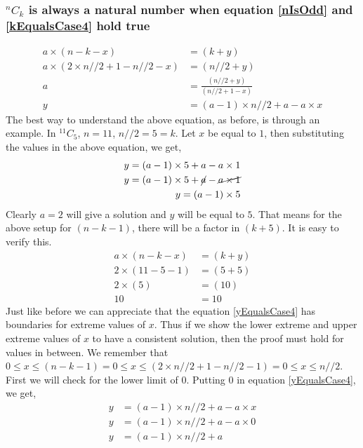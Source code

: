 \documentclass[12pt, twoside]{article}
\newcommand*{\Combination}[2]{{}^{#1}C_{#2}}%
\begin{document}
\subsubsection{$\Combination{n}{k}$ is always a natural number when equation \eqref{nIsOdd} and \eqref{kEqualsCase4} hold true}\label{ProofkEqualsCase4}
\begin{align}
	a \times (n-k-x) &= (k+y) \nonumber \\
	a \times (2\times n//2 + 1 - n//2 - x) &= (n//2 + y) \nonumber \\
	a &= \frac{(n//2 + y)}{(n//2 + 1 - x)} \nonumber \\
	y &= (a-1)\times n//2 + a - a\times x \label{yEqualsCase4}	
\end{align}
The best way to understand the above equation, as before, is through an example.\newline
In $\Combination{11}{5}$, $n=11$, $n//2=5=k$. Let $x$ be equal to $1$, then substituting the values in the above equation, we get,
\begin{align*}
	y = (a-1)\times 5 + a - a\times 1 \\
	y = (a-1)\times 5 + \cancel{a} - \cancel{a\times 1} \\
	y = (a-1)\times 5
\end{align*}
Clearly $a = 2$ will give a solution and $y$ will be equal to $5$. That means for the above setup for $(n-k-1)$, there will be a factor in $(k+5)$. It is easy to verify this.\newline
\begin{align*}
	a \times (n-k-x) &= (k+y) \nonumber \\
	2 \times (11-5-1) &= (5+5) \nonumber \\
	2 \times (5) &= (10) \nonumber \\
	10 &= 10
\end{align*}
Just like before we can appreciate that the equation \eqref{yEqualsCase4} has boundaries for extreme values of $x$. Thus if we show the lower extreme and upper extreme values of $x$ to have a consistent solution, then the proof must hold for values in between.\newline
We remember that $0 \leq x \leq (n-k-1)=0 \leq x \leq (2\times n//2 + 1-n//2-1)=0 \leq x \leq n//2$. First we will check for the lower limit of $0$. Putting $0$ in equation \eqref{yEqualsCase4}, we get,
\begin{align*}
	y &= (a-1)\times n//2 + a - a\times x \\
	y &= (a-1)\times n//2 + a - a\times 0 \\
	y &= (a-1)\times n//2 + a \\
\end{align*}
\end{document}
